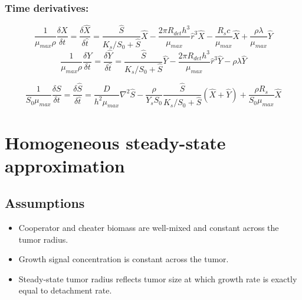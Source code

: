 \documentclass[11pt]{amsart}
\begin{document}
		\subsubsection{Time derivatives:}
			\begin{equation}
				\frac{1}{\mu_{max} \rho} \frac{\delta X}{\delta t} = 
					 \frac{\delta \hat{X}}{\delta \hat{t}} = 
					\frac{\hat{S}}{K_s / S_0 + \hat{S}}\hat{X} 
					- \frac{2 \pi R_{det} h^3}{\mu_{max}}\hat{r}^3\hat{X} 
					-  \frac{R_s c}{\mu_{max}} \hat{X} 
					+ \frac{\rho \lambda}{\mu_{max}} \hat{Y}	
			\end{equation}
			\begin{equation}
				\frac{1}{\mu_{max}\rho}\frac{\delta Y}{\delta t} = \frac{\delta\hat{Y}}{\delta\hat{t}} = 
					\frac{\hat{S}}{K_s / S_0 + \hat{S}}\hat{Y} 
					- \frac{2\pi R_{det} h^3}{\mu_{max}}\hat{r}^3\hat{Y} 
					- \rho \lambda \hat{Y}
			\end{equation} 
				
			\begin{equation}
				\frac{1}{S_0 \mu_{max}} \frac{\delta S}{\delta t} =
					 \frac{\delta \hat{S}}{\delta \hat{t}} =
					 \frac{D}{h^2 \mu_{max}} \nabla^2\hat{S} 
					- \frac{ \rho}{Y_s S_0}\frac{\hat{S}}{K_s/S_0 + \hat{S}}(\hat{X}+\hat{Y})
					+ \frac{\rho R_s}{S_0 \mu_{max}} \hat{X}
			\end{equation}
				
	\section{Homogeneous steady-state approximation}
		\subsection{Assumptions}
			\begin{flushleft}
				\begin{itemize}
					\item Cooperator and cheater biomass are well-mixed and constant across the tumor radius. \\
					\item Growth signal concentration is constant across the tumor. \\
					\item Steady-state tumor radius reflects tumor size at which growth rate is exactly equal to detachment rate. \\
				\end{itemize}
			\end{flushleft}
\end{document}
